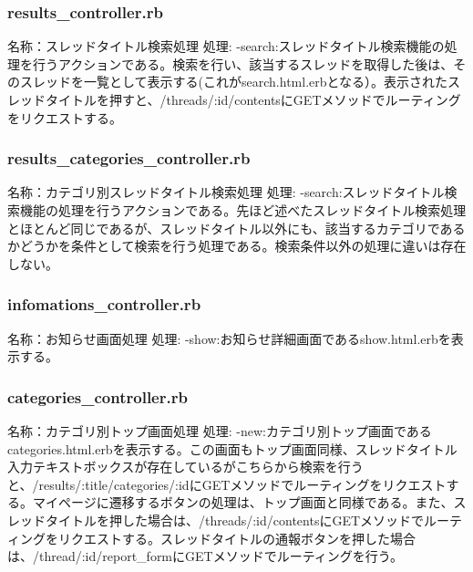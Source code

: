 \documentclass[a4j]{jarticle}
\begin{document}
\subsubsection{results\_controller.rb}
\noindent 名称：スレッドタイトル検索処理 \newline
処理:\newline
-search:スレッドタイトル検索機能の処理を行うアクションである。検索を行い、該当するスレッドを取得した後は、そのスレッドを一覧として表示する(これがsearch.html.erbとなる）。表示されたスレッドタイトルを押すと、/threads/:id/contentsにGETメソッドでルーティングをリクエストする。\newline

\subsubsection{results\_categories\_controller.rb}
\noindent 名称：カテゴリ別スレッドタイトル検索処理 \newline
処理:\newline
-search:スレッドタイトル検索機能の処理を行うアクションである。先ほど述べたスレッドタイトル検索処理とほとんど同じであるが、スレッドタイトル以外にも、該当するカテゴリであるかどうかを条件として検索を行う処理である。検索条件以外の処理に違いは存在しない。\newline



\subsubsection{infomations\_controller.rb}
\noindent 名称：お知らせ画面処理 \newline
処理:\newline
-show:お知らせ詳細画面であるshow.html.erbを表示する。\newline



\subsubsection{categories\_controller.rb}
\noindent 名称：カテゴリ別トップ画面処理 \newline
処理:\newline
-new:カテゴリ別トップ画面であるcategories.html.erbを表示する。この画面もトップ画面同様、スレッドタイトル入力テキストボックスが存在しているがこちらから検索を行うと、/results/:title/categories/:idにGETメソッドでルーティングをリクエストする。マイページに遷移するボタンの処理は、トップ画面と同様である。また、スレッドタイトルを押した場合は、/threads/:id/contentsにGETメソッドでルーティングをリクエストする。スレッドタイトルの通報ボタンを押した場合は、/thread/:id/report\_formにGETメソッドでルーティングを行う。\newline
\end{document}
